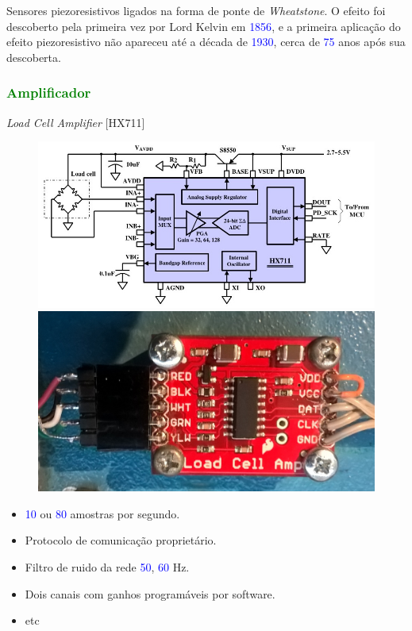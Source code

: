 \begin{frame}
\begin{figure}[!b]
\end{figure}
Sensores piezoresistivos ligados na forma de ponte de \textit{Wheatstone}.
\newline
\newline
O efeito foi descoberto pela primeira vez por Lord Kelvin em \textcolor{blue}{1856}, e a primeira aplicação do efeito piezoresistivo não apareceu até a década de \textcolor{blue}{1930}, cerca de \textcolor{blue}{75} anos após sua descoberta.
\end{frame}
\begin{frame}
\frametitle{\textcolor{green}{Amplificador}}
\textit{Load Cell Amplifier} [HX711]
\begin{figure}[H]
	\includegraphics[scale=0.25]{./image/PESTA/schematic/HX711_Schematic_1.jpg}
	\hspace{2cm}
	\includegraphics[scale=0.05]{./image/PESTA/material/HX711_board_1.jpg}
\end{figure}
\begin{itemize}
	\item \textcolor{blue}{10} ou \textcolor{blue}{80} amostras por segundo.
	\item Protocolo de comunicação proprietário.
	\item Filtro de ruido da rede \textcolor{blue}{50}, \textcolor{blue}{60} Hz.
	\item Dois canais com ganhos programáveis por software.
	\item etc
\end{itemize}
\end{frame}

